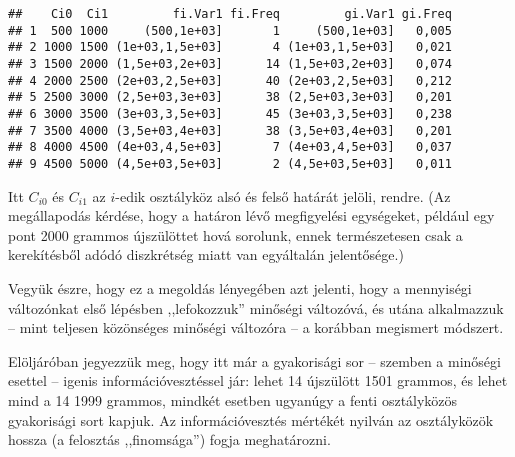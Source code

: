\documentclass[]{book}
\newenvironment{Shaded}{\begin{snugshade}}{\end{snugshade}}
\newcommand{\KeywordTok}[1]{\textcolor[rgb]{0.13,0.29,0.53}{\textbf{#1}}}
\newcommand{\DataTypeTok}[1]{\textcolor[rgb]{0.13,0.29,0.53}{#1}}
\newcommand{\DecValTok}[1]{\textcolor[rgb]{0.00,0.00,0.81}{#1}}
\newcommand{\StringTok}[1]{\textcolor[rgb]{0.31,0.60,0.02}{#1}}
\newcommand{\OperatorTok}[1]{\textcolor[rgb]{0.81,0.36,0.00}{\textbf{#1}}}
\newcommand{\NormalTok}[1]{#1}
\begin{document}
\begin{Shaded}
\end{Shaded}

\begin{verbatim}
##    Ci0  Ci1         fi.Var1 fi.Freq         gi.Var1 gi.Freq
## 1  500 1000     (500,1e+03]       1     (500,1e+03]   0,005
## 2 1000 1500 (1e+03,1,5e+03]       4 (1e+03,1,5e+03]   0,021
## 3 1500 2000 (1,5e+03,2e+03]      14 (1,5e+03,2e+03]   0,074
## 4 2000 2500 (2e+03,2,5e+03]      40 (2e+03,2,5e+03]   0,212
## 5 2500 3000 (2,5e+03,3e+03]      38 (2,5e+03,3e+03]   0,201
## 6 3000 3500 (3e+03,3,5e+03]      45 (3e+03,3,5e+03]   0,238
## 7 3500 4000 (3,5e+03,4e+03]      38 (3,5e+03,4e+03]   0,201
## 8 4000 4500 (4e+03,4,5e+03]       7 (4e+03,4,5e+03]   0,037
## 9 4500 5000 (4,5e+03,5e+03]       2 (4,5e+03,5e+03]   0,011
\end{verbatim}

Itt \(C_{i0}\) és \(C_{i1}\) az \(i\)-edik osztályköz alsó és felső
határát jelöli, rendre. (Az megállapodás kérdése, hogy a határon lévő
megfigyelési egységeket, például egy pont 2000 grammos újszülöttet hová
sorolunk, ennek természetesen csak a kerekítésből adódó diszkrétség
miatt van egyáltalán jelentősége.)

Vegyük észre, hogy ez a megoldás lényegében azt jelenti, hogy a
mennyiségi változónkat első lépésben ,,lefokozzuk'' minőségi változóvá,
és utána alkalmazzuk -- mint teljesen közönséges minőségi változóra -- a
korábban megismert módszert.

Elöljáróban jegyezzük meg, hogy itt már a gyakorisági sor -- szemben a
minőségi esettel -- igenis információvesztéssel jár: lehet 14 újszülött
1501 grammos, és lehet mind a 14 1999 grammos, mindkét esetben ugyanúgy
a fenti osztályközös gyakorisági sort kapjuk. Az információvesztés
mértékét nyilván az osztályközök hossza (a felosztás ,,finomsága'')
fogja meghatározni.
\end{document}
